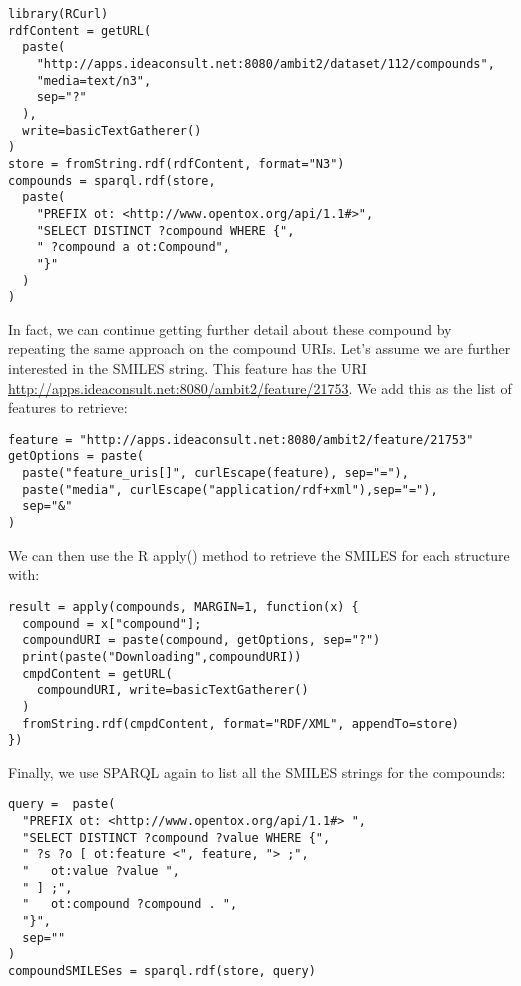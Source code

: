 \documentclass[12pt]{article}
\begin{document}
\begin{footnotesize}
\begin{verbatim}
library(RCurl)
rdfContent = getURL(
  paste(
    "http://apps.ideaconsult.net:8080/ambit2/dataset/112/compounds",
    "media=text/n3",
    sep="?"
  ),
  write=basicTextGatherer()
)
store = fromString.rdf(rdfContent, format="N3")
compounds = sparql.rdf(store,
  paste(
    "PREFIX ot: <http://www.opentox.org/api/1.1#>",
    "SELECT DISTINCT ?compound WHERE {",
    " ?compound a ot:Compound",
    "}"
  )
)
\end{verbatim}
\end{footnotesize}

In fact, we can continue getting further detail about these compound by repeating the same
approach on the compound URIs. Let's assume we are further interested in the SMILES string.
This feature has the URI \url{http://apps.ideaconsult.net:8080/ambit2/feature/21753}. We
add this as the list of features to retrieve:

\begin{footnotesize}
\begin{verbatim}
feature = "http://apps.ideaconsult.net:8080/ambit2/feature/21753"
getOptions = paste(
  paste("feature_uris[]", curlEscape(feature), sep="="),
  paste("media", curlEscape("application/rdf+xml"),sep="="),
  sep="&"
)
\end{verbatim}
\end{footnotesize}

We can then use the R apply() method to retrieve the SMILES for each structure with:

\begin{footnotesize}
\begin{verbatim}
result = apply(compounds, MARGIN=1, function(x) {
  compound = x["compound"];
  compoundURI = paste(compound, getOptions, sep="?")
  print(paste("Downloading",compoundURI))
  cmpdContent = getURL(
    compoundURI, write=basicTextGatherer()
  )
  fromString.rdf(cmpdContent, format="RDF/XML", appendTo=store)
})
\end{verbatim}
\end{footnotesize}

Finally, we use SPARQL again to list all the SMILES strings for the compounds:

\begin{footnotesize}
\begin{verbatim}
query =  paste(
  "PREFIX ot: <http://www.opentox.org/api/1.1#> ",
  "SELECT DISTINCT ?compound ?value WHERE {",
  " ?s ?o [ ot:feature <", feature, "> ;",
  "   ot:value ?value ",
  " ] ;",
  "   ot:compound ?compound . ",
  "}",
  sep=""    
)
compoundSMILESes = sparql.rdf(store, query)
\end{verbatim}
\end{footnotesize}
\end{document}
